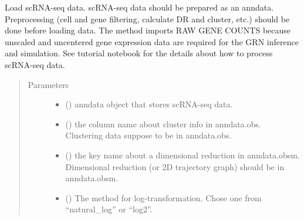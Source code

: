 \documentclass[letterpaper,10pt,english]{sphinxmanual}
\begin{document}
\begin{fulllineitems}
\begin{fulllineitems}
\begin{quote}
\begin{description}
\begin{itemize}
\end{itemize}

\end{description}\end{quote}

\end{fulllineitems}


\begin{fulllineitems}
\label{\detokenize{modules/celloracle:celloracle.Oracle.import_anndata_as_raw_count}}
Load scRNA-seq data. scRNA-seq data should be prepared as an anndata.
Preprocessing (cell and gene filtering, calculate DR and cluster, etc.) should be done before loading data.
The method imports RAW GENE COUNTS because unscaled and uncentered gene expression data are required for the GRN inference and simulation.
See tutorial notebook for the details about how to process scRNA-seq data.
\begin{quote}\begin{description}
\item[{Parameters}] \leavevmode\begin{itemize}
\item {} 
 () \textendash{} anndata object that stores scRNA-seq data.

\item {} 
 () \textendash{} the column name about cluster info in anndata.obs.
Clustering data suppose to be in anndata.obs.

\item {} 
 () \textendash{} the key name about a dimensional reduction in anndata.obsm.
Dimensional reduction (or 2D trajectory graph) should be in anndata.obsm.

\item {} 
 () \textendash{} The method for log-transformation. Chose one from “natural\_log” or “log2”.


\end{itemize}
\end{description}
\end{quote}
\end{fulllineitems}
\end{fulllineitems}
\end{document}
